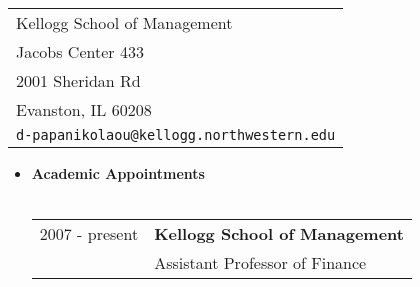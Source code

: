 \documentclass[11pt,a4paper,sans]{moderncv}
\begin{document}

\setlength{\leftmargini}{0em}
\renewcommand{\labelitemi}{}

\renewcommand{\namefont}{\large\textbf}



\begin{resume}

\begin{tabular}{l}
  Kellogg School of Management            \\
  Jacobs Center 433           \\
  2001 Sheridan Rd                         \\
  Evanston, IL 60208               \\
  {\tt d-papanikolaou@kellogg.northwestern.edu}  \\
\end{tabular}
\vspace{1.5cm}
\begin{itemize}

\item \textbf{Academic Appointments}\\
\\
\begin{tabular}{ll}
2007 - present & \textbf{Kellogg School of Management}\\
& Assistant Professor of Finance\\[0.2cm]
\end{tabular}

\vspace{0.6cm}



\end{itemize}
\end{resume}
\end{document}
